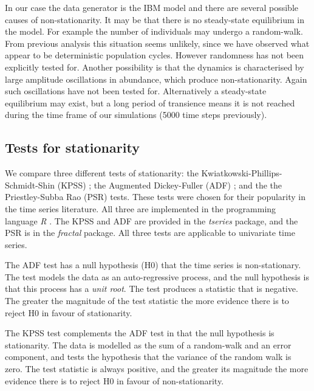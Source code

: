 In our case the data generator is the IBM model and there are several possible causes of non-stationarity. It may be that there is no steady-state equilibrium in the model. For example the number of individuals may undergo a random-walk. From previous analysis this situation seems unlikely, since we have observed what appear to be deterministic population cycles. However randomness has not been explicitly tested for. Another possibility is that the dynamics is characterised by large amplitude oscillations in abundance, which produce non-stationarity. Again such oscillations have not been tested for. Alternatively a steady-state equilibrium may exist, but a long period of transience means it is not reached during the time frame of our simulations (5000 time steps previously).


\subsection{Tests for stationarity}
\label{sec:stat_tests}

We compare three different tests of stationarity: the Kwiatkowski-Phillips-Schmidt-Shin (KPSS) \cite{kwiatkowski1992testing}; the Augmented Dickey-Fuller (ADF) \cite{said1984testing}; and the the Priestley-Subba Rao (PSR) \cite{priestley1969test} tests. These tests were chosen for their popularity in the time series literature. All three are implemented in the programming language \emph{R} \cite{Rlanguage}. The KPSS and ADF are provided in the \emph{tseries} package, and the PSR is in the \emph{fractal} package. All three tests are applicable to univariate time series.

The ADF test has a null hypothesis (H0) that the time series is non-stationary. The test models the data as an auto-regressive process, and the null hypothesis is that this process has a \emph{unit root}. The test produces a statistic that is negative. The greater the magnitude of the test statistic the more evidence there is to reject H0 in favour of stationarity.

The KPSS test complements the ADF test in that the null hypothesis is stationarity. The data is modelled as the sum of a random-walk and an error component, and tests the hypothesis that the variance of the random walk is zero. The test statistic is always positive, and the greater its magnitude the more evidence there is to reject H0 in favour of non-stationarity.

